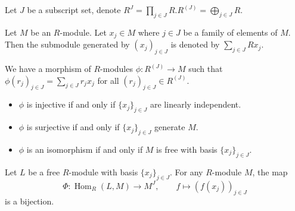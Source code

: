 \begin{definition}
    Let $J$ be a subscript set, denote $R^J=\prod_{j\in J} R$.$R^{(J)}=\bigoplus_{j\in J} R$.

    Let $M$ be an $R$-module. Let $x_j \in M$ where $j \in J$ be a family of elements of $M$. Then the submodule generated by $(x_j)_{j\in J}$ is denoted by $\sum_{j\in J} Rx_j$.
\end{definition}

\begin{corollary}
    We have a morphism of $R$-modules $\phi: R^{(J)} \to M$ such that $\phi(r_j)_{j \in J}=\sum_{j \in J}r_jx_j$ for all $(r_j)_{j \in J} \in R^{(J)}$.
    \begin{itemize}
        \item $\phi$ is injective if and only if $\{x_j\}_{j\in J}$ are linearly independent.
        \item $\phi$ is surjective if and only if $\{x_j\}_{j\in J}$ generate $M$.
        \item $\phi$ is an isomorphism if and only if $M$ is free with basis $\{x_j\}_{j\in J}$.
    \end{itemize}
\end{corollary}

\begin{lemma}
    Let $L$ be a free $R$-module with basis $\{x_j\}_{j\in J}$. For any $R$-module $M$, the map
    \[
        \Phi:\operatorname{Hom}_R(L,M)\to M^J,\qquad
        f\mapsto (f(x_j))_{j\in J}
    \]
    is a bijection.
\end{lemma}

